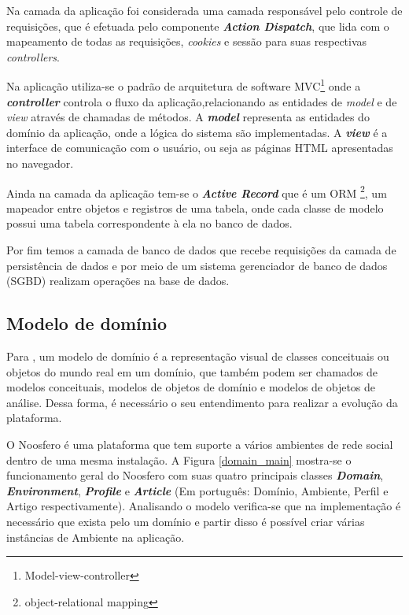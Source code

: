 Na camada da aplicação foi considerada uma camada responsável pelo controle de requisições, que é efetuada pelo componente \textbf{\textit{Action Dispatch}}, que lida com o mapeamento de todas as requisições, \textit{cookies} e sessão para suas respectivas \textit{controllers}.

Na aplicação utiliza-se o padrão de arquitetura de software MVC\footnote{Model-view-controller} onde a \textbf{\textit{controller}} controla o fluxo da aplicação,relacionando as entidades de \textit{model} e de \textit{view} através de chamadas de métodos. A \textbf{\textit{model}} representa as entidades do domínio da aplicação, onde a lógica do sistema são implementadas. A \textbf{\textit{view}} é a interface de comunicação com o usuário, ou seja as páginas HTML apresentadas no navegador.

Ainda na camada da aplicação tem-se o \textbf{\textit{Active Record}} que é um ORM \footnote{object-relational mapping}, um mapeador entre objetos e registros de uma tabela, onde cada classe de modelo possui uma tabela correspondente à ela no banco de dados.

Por fim temos a camada de banco de dados que recebe requisições da camada de persistência de dados e por meio de um sistema gerenciador de banco de dados (SGBD) realizam operações na base de dados.

\subsection{Modelo de domínio}

Para , um modelo de domínio é a representação visual de classes conceituais ou objetos do mundo real em um domínio, que também podem ser chamados de modelos conceituais, modelos de objetos de domínio e modelos de objetos de análise. Dessa forma, é necessário o seu entendimento para realizar a evolução da plataforma.

O Noosfero é uma plataforma que tem suporte a vários ambientes de rede social dentro de uma mesma instalação. A Figura \ref{domain_main} mostra-se o funcionamento geral do Noosfero com suas quatro principais classes \textbf{\textit{Domain}}, \textbf{\textit{Environment}}, \textbf{\textit{Profile}} e \textbf{\textit{Article}} (Em português: Domínio, Ambiente, Perfil e Artigo respectivamente). Analisando o modelo verifica-se que na implementação é necessário que exista pelo um domínio e partir disso é possível criar várias instâncias de Ambiente na aplicação.

